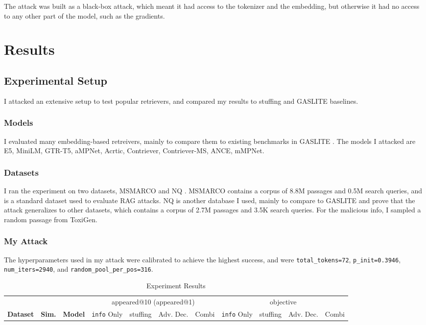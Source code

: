 \documentclass[a4paper, sigconf]{acmart}
\begin{document}
The attack was built as a black-box attack, which meant it had access to the tokenizer and the embedding, but otherwise it had no access to any other part of the model, such as the gradients.


\section{Results}

\subsection{Experimental Setup} \label{sec:expset}

I attacked an extensive setup to test popular retrievers, and compared my results to stuffing and GASLITE baselines.

\subsubsection*{Models} I evaluated many embedding-based retreivers, mainly to compare them to existing benchmarks in GASLITE \cite{bentov2024}. The models I attacked are E5, MiniLM, GTR-T5, aMPNet, Acrtic, Contriever, Contriever-MS, ANCE, mMPNet. %

\subsubsection*{Datasets} I ran the experiment on two datasets, MSMARCO \cite{msmarco} and NQ \cite{nq}. MSMARCO contains a corpus of 8.8M passages and 0.5M search queries, and is a standard dataset used to evaluate RAG attacks. NQ is another database I used, mainly to compare to GASLITE \cite{bentov2024} and prove that the attack generalizes to other datasets, which contains a corpus of 2.7M passages and 3.5K search queries. For the malicious info, I sampled a random passage from ToxiGen.

\subsubsection*{My Attack} The hyperparameters used in my attack were calibrated to achieve the highest success, and were  \texttt{total\_tokens=72}, \texttt{p\_init=0.3946}, \texttt{num\_iters=2940}, and \texttt{random\_pool\_per\_pos=316}.


\begin{table}[h!]
\caption{Experiment Results}
\label{table:res}
\begin{tabular}{lll|cccc|cccc}
  \hline
   & & & \multicolumn{4}{c}{appeared@10 (appeared@1)} & \multicolumn{4}{c}{objective} \\
  \textbf{Dataset} & \textbf{Sim.} & \textbf{Model} & \texttt{info} Only & stuffing & Adv. Dec. & Combi & \texttt{info} Only & stuffing & Adv. Dec. & Combi \\
  \hline
 
 \end{tabular}
\end{table}
\end{document}
